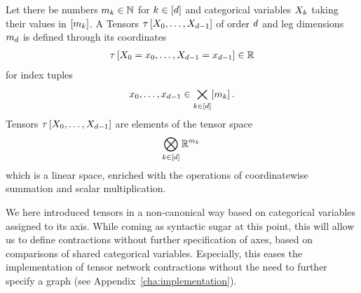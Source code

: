 \begin{definition}[Tensor]\label{def:tensor}
	Let there be numbers $m_{k}\in\mathbb{N}$ for $k\in[d]$ and categorical variables $X_{k}$ taking their values in $[m_{k}]$.
	A Tensors $\tau\left[X_{0},\ldots,X_{d-1}\right]$ of order $d$ and leg dimensions $m_{d}$ is defined through its coordinates
	\begin{align*}
		\tau\left[X_{0}=x_{0},\ldots,X_{d-1}=x_{d-1}\right] \in \mathbb{R}
	\end{align*}
	for index tuples
	\begin{align*}
		x_{0},\ldots,x_{d-1} \in \bigtimes_{k\in[d]}[m_{k}] \, .
	\end{align*}
	Tensors $\tau\left[X_{0},\ldots,X_{d-1}\right]$ are elements of the tensor space
	\begin{align*}
		\bigotimes_{k\in[d]} \mathbb{R}^{m_{k}} \,
	\end{align*}
	which is a linear space, enriched with the operations of coordinatewise summation and scalar multiplication.
\end{definition}

We here introduced tensors in a non-canonical way based on categorical variables assigned to its axis.
While coming as syntactic sugar at this point, this will allow us to define contractions without further specification of axes, based on comparisons of shared categorical variables.
Especially, this eases the implementation of tensor network contractions without the need to further specify a graph (see Appendix~\ref{cha:implementation}).

